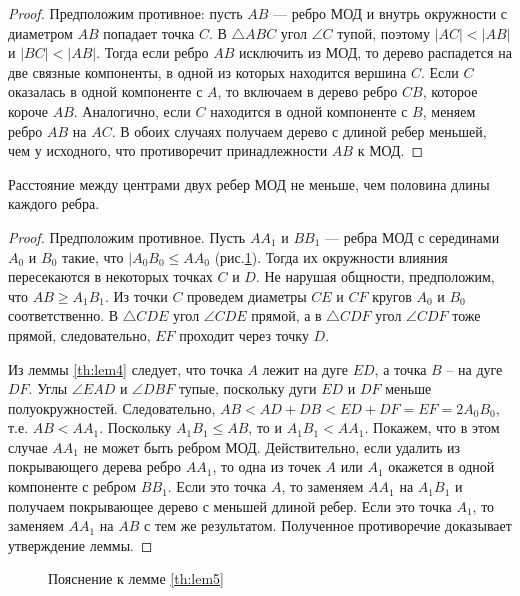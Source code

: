 \documentclass[12pt]{article}
\begin{document}
\begin{proof}
Предположим противное: пусть $AB$ –-- ребро МОД и внутрь окружности с диаметром $AB$ попадает точка $C$.
В $\triangle ABC$ угол $\angle C$ тупой, поэтому $|AC| < |AB|$ и $|BC| < |AB|$. Тогда если ребро $AB$ исключить из МОД, то дерево распадется на две связные компоненты, в одной из которых находится вершина $C$.
Если $C$ оказалась в одной компоненте с $A$, то включаем в дерево ребро $CB$, которое короче $AB$.
Аналогично, если $C$ находится в одной компоненте с $B$, меняем ребро $AB$ на $AC$.
В обоих случаях получаем дерево с длиной ребер меньшей, чем у исходного, что противоречит принадлежности $AB$ к МОД. 
\end{proof}

\begin{lemma}
\label{th:lem5}
Расстояние между центрами двух ребер МОД не меньше, чем половина длины каждого ребра.
\end{lemma}

\begin{proof}
Предположим противное. Пусть $AA_1$ и $BB_1$ –-- ребра МОД с серединами $A_0$ и $B_0$ такие, что $|A_0B_0 \le AA_0$ (рис.\ref{pic:lem5}).
Тогда их окружности влияния пересекаются в некоторых точках $C$ и $D$.
Не нарушая общности, предположим, что $AB \ge A_1B_1$.
Из точки $C$ проведем диаметры $CE$ и $CF$ кругов $A_0$ и $B_0$ соответственно.
В $\triangle CDE$ угол $\angle CDE$ прямой, а в $\triangle CDF$ угол $\angle CDF$ тоже прямой, следовательно, $EF$ проходит через точку $D$.

Из леммы \ref{th:lem4} следует, что точка $A$ лежит на дуге $ED$, а точка $B$ – на дуге $DF$.
Углы $\angle EAD$ и $\angle DBF$ тупые, поскольку дуги $ED$ и $DF$ меньше полуокружностей.
Следовательно, $AB < AD + DB < ED + DF = EF = 2A_0B_0$, т.е. $AB < AA_1$.
Поскольку $A_1B_1 \le AB$, то и $A_1B_1 < AA_1$.
Покажем, что в этом случае $AA_1$ не может быть ребром МОД.
Действительно, если удалить из покрывающего дерева ребро $AA_1$, то одна из точек $A$ или $A_1$ окажется в одной компоненте с ребром $BB_1$.
Если это точка $A$, то заменяем $AA_1$ на $A_1B_1$ и получаем покрывающее дерево с меньшей длиной ребер.
Если это точка $A_1$, то заменяем $AA_1$ на $AB$ с тем же результатом.
Полученное противоречие доказывает утверждение леммы. 

\end{proof}

\begin{figure}[htb!]
	\caption{Пояснение к лемме \ref{th:lem5}}
	\label{pic:lem5}
\end{figure}
\end{document}
